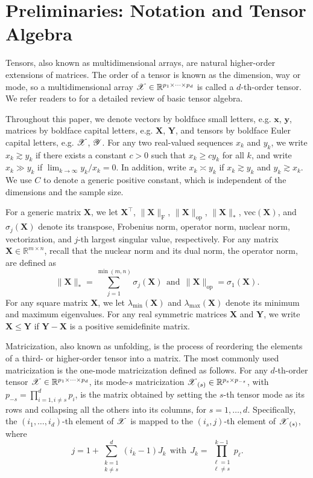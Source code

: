 \documentclass[12pt]{article}
\newcommand{\bm}{\boldsymbol}
\newcommand{\cm}[1]{\mbox{\boldmath$\mathscr{#1}$}}
\begin{document}
\section{Preliminaries: Notation and Tensor Algebra \label{sec:prelim}}
Tensors, also known as multidimensional arrays, are natural higher-order extensions of  matrices. The order of a tensor is known as the dimension, way or mode, so a multidimensional array $\cm{X}\in\mathbb{R}^{p_1\times\cdots\times p_d}$ is called a $d$-th-order tensor. We refer readers to \citet{kolda2009tensor} for a detailed review of basic tensor algebra. 

Throughout this paper, we denote vectors by boldface small letters, e.g. $\bm{x}$, $\bm{y}$,  matrices by boldface capital letters, e.g. $\bm{X}$, $\bm{Y}$, and tensors by boldface Euler capital letters, e.g. $\cm{X}$, $\cm{Y}$. For any two real-valued sequences $x_k$ and $y_k$, we write $x_k\gtrsim y_k$ if there exists a  constant $c>0$ such that $x_k\geq cy_k$ for all $k$,  and write $x_k\gg y_k$ if $\lim_{k\rightarrow\infty}y_k/x_k=0$. In addition, write $x_k\asymp y_k$ if $x_k\gtrsim y_k$ and $y_k\gtrsim x_k$. We use $C$ to denote a generic positive constant, which is independent of the dimensions and the sample size.


For a generic matrix $\bm{X}$,  we let $\bm{X}^\top$, $\|\bm{X}\|_{\text{F}}$, $\|\bm{X}\|_{\text{op}}$, $\|\bm{X}\|_*$,  $\text{vec}(\bm{X})$, and $\sigma_j(\bm{X})$ denote its transpose, Frobenius norm, operator norm, nuclear norm,  vectorization, and $j$-th largest singular value, respectively. For any matrix $\bm{X}\in\mathbb{R}^{m\times n}$, recall that  the nuclear norm and its dual norm, the operator norm, are defined as
\begin{equation}
\|\bm{X}\|_*=\sum_{j=1}^{\min(m,n)}\sigma_j(\bm{X})~~\text{and}~~\|\bm{X}\|_{\text{op}}=\sigma_1(\bm{X}).
\end{equation}
For any square matrix $\bm{X}$, we let $\lambda_{\min}(\bm{X})$ and $\lambda_{\max}(\bm{X})$ denote its minimum and maximum eigenvalues. 
For any real symmetric matrices $\bm{X}$ and $\bm{Y}$, we write $\bm{X} \leq \bm{Y}$ if $\bm{Y}-\bm{X}$ is a positive semidefinite matrix.


Matricization, also known as unfolding, is the process of reordering the elements of a third- or higher-order tensor into a matrix. The most commonly used matricization is the one-mode matricization defined as follows.  For any $d$-th-order tensor $\cm{X}\in\mathbb{R}^{p_1\times\cdots\times p_d}$, its mode-$s$  matricization $\cm{X}_{(s)}\in\mathbb{R}^{p_s\times p_{-s}}$, with $p_{-s}=\prod_{i=1, i\neq s}^{d}p_i$, is the matrix obtained by setting the $s$-th tensor mode as its rows and collapsing all the others into  its columns, for $s=1,\dots, d$. Specifically,  the $(i_1,\dots,i_d)$-th element of $\cm{X}$  is mapped to the $(i_s,j)$-th element of $\cm{X}_{(s)}$, where
\begin{equation}
j=1+\sum_{\substack{k=1\\k\neq s}}^d(i_k-1)J_k~~\text{with}~~J_k=\prod_{\substack{\ell=1\\\ell\neq s}}^{k-1}p_\ell.
\end{equation}
\end{document}
